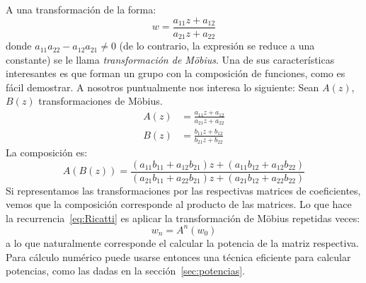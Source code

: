   A una transformación de la forma:
  \begin{equation}
    \label{eq:Moebius-tranform}
    w = \frac{a_{1 1} z + a_{1 2}}{a_{2 1} z + a_{2 2}}
  \end{equation}
  donde \(a_{11} a_{22} - a_{12} a_{21} \ne 0\)
  (de lo contrario,
   la expresión se reduce a una constante)
  se le llama \emph{transformación de Möbius}.%
  Una de sus características interesantes es que forman un grupo
  con la composición de funciones,%
  como es fácil demostrar.
  A nosotros puntualmente nos interesa lo siguiente:
  Sean \(A(z)\), \(B(z)\) transformaciones de Möbius.
  \begin{align}
    A(z)
     &= \frac{a_{1 1} z + a_{1 2}}{a_{2 1} z + a_{2 2}}
	  \label{eq:Moebius-A} \\
    B(z)
     &= \frac{b_{1 1} z + b_{1 2}}{b_{2 1} z + b_{2 2}}
	  \label{eq:Moebius-B}
  \end{align}
  La composición es:
  \begin{equation}
    \label{eq:Moebius-AB}
    A(B(z))
      = \frac{(a_{11} b_{11} + a_{12} b_{21}) z
		 + (a_{11} b_{12} + a_{12} b_{22})}
	     {(a_{21} b_{11} + a_{22} b_{21}) z
		 + (a_{21} b_{12} + a_{22} b_{22})}
  \end{equation}
  Si representamos las transformaciones
  por las respectivas matrices de coeficientes,
  vemos que la composición corresponde al producto de las matrices.
  Lo que hace la recurrencia~\eqref{eq:Ricatti}
  es aplicar la transformación de Möbius repetidas veces:
  \begin{equation}
    \label{eq:Ricatti-Moebius}
    w_n
      = A^n(w_0)
  \end{equation}
  a lo que naturalmente corresponde
  el calcular la potencia de la matriz respectiva.
  Para cálculo numérico puede usarse
  entonces una técnica eficiente para calcular potencias,
  como las dadas en la sección~\ref{sec:potencias}.%


